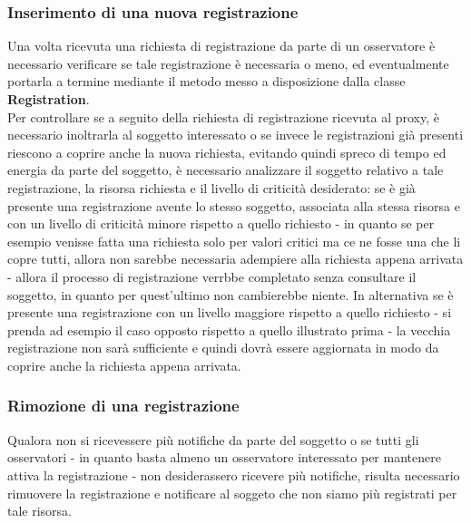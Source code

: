 \subsubsection{Inserimento di una nuova registrazione}
Una volta ricevuta una richiesta di registrazione da parte di un osservatore è necessario verificare se tale registrazione è necessaria o meno, ed eventualmente portarla a termine mediante il metodo messo a disposizione dalla classe \textbf{Registration}. \\
Per controllare se a seguito della richiesta di registrazione ricevuta al proxy, è necessario inoltrarla al soggetto interessato o se invece le registrazioni già presenti riescono a coprire anche la nuova richiesta, evitando quindi spreco di tempo ed energia da parte del soggetto, è necessario analizzare il soggetto relativo a tale registrazione, la risorsa richiesta e il livello di criticità desiderato: se è già presente una registrazione avente lo stesso soggetto, associata alla stessa risorsa e con un livello di criticità minore rispetto a quello richiesto - in quanto se per esempio venisse fatta una richiesta solo per valori critici ma ce ne fosse una che li copre tutti, allora non sarebbe necessaria adempiere alla richiesta appena arrivata - allora il processo di registrazione verrbbe completato senza consultare il soggetto, in quanto per quest'ultimo non cambierebbe niente. In alternativa se è presente una registrazione con un livello maggiore rispetto a quello richiesto - si prenda ad esempio il caso opposto rispetto a quello illustrato prima - la vecchia registrazione non sarà sufficiente e quindi dovrà essere aggiornata in modo da coprire anche la richiesta appena arrivata. \\

\subsubsection{Rimozione di una registrazione}
Qualora non si ricevessere più notifiche da parte del soggetto o se tutti gli osservatori - in quanto basta almeno un osservatore interessato per mantenere attiva la registrazione - non desiderassero ricevere più notifiche, risulta necessario rimuovere la registrazione e notificare al soggeto che non siamo più registrati per tale risorsa. \\

